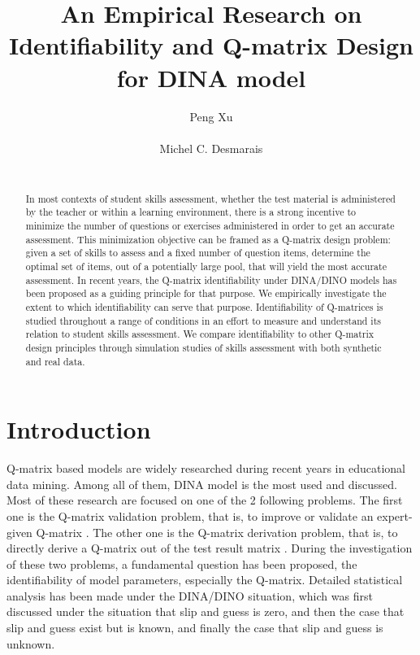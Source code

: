 \documentclass{edm_template}
\begin{document}
\title{An Empirical Research on Identifiability and Q-matrix Design for DINA model}
\author{
\alignauthor
Peng Xu\\
       \\
\alignauthor
Michel C. Desmarais\\
       \\
}
\maketitle

\begin{abstract}
In most contexts of student skills assessment, whether the test material is administered by the teacher or within a learning environment, there is a strong incentive to minimize the number of questions or exercises administered in order to get an accurate assessment.  This minimization objective can be framed as a Q-matrix design problem: given a set of skills to assess and a fixed number of question items, determine the optimal set of items, out of a potentially large pool, that will yield the most accurate assessment.  In recent years, the Q-matrix identifiability under DINA/DINO models has been proposed as a guiding principle for that purpose.  We empirically investigate the extent to which identifiability can serve that purpose. Identifiability of Q-matrices is studied throughout a range of conditions in an effort to measure and understand its relation to student skills assessment.  We compare identifiability to other Q-matrix design principles through simulation studies of skills assessment with both synthetic and real data.
\end{abstract}
\section{Introduction}
Q-matrix based models are widely researched during recent years in educational data mining. Among all of them, DINA model is the most used and discussed. Most of these research are focused on one of the 2 following problems. The first one is the Q-matrix validation problem, that is, to improve or validate an expert-given Q-matrix \cite{de2015general, chiu2013statistical, desmarais2013matrix}. The other one is the Q-matrix derivation problem, that is, to directly derive a Q-matrix out of the test result matrix \cite{barnes2010novel, liu2012data, desmarais2015combining, xu2016boosted}. During the investigation of these two problems, a fundamental question has been proposed, the identifiability of model parameters, especially the Q-matrix. Detailed statistical analysis has been made under the DINA/DINO situation, which was first discussed under the situation that slip and guess is zero\cite{chiu2009cluster}, and then the case that slip and guess exist but is known\cite{liu2013theory}, and finally the case that slip and guess is unknown\cite{chen2015statistical}. 
\end{document}
